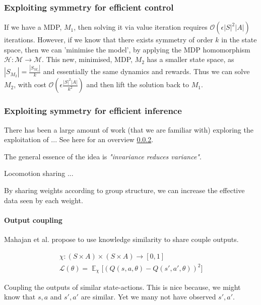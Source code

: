 \subsubsection{Exploiting symmetry for efficient control}

If we have a MDP, $M_1$, then solving it via value iteration requires $\mathcal O(\epsilon |S|^2|A|)$ iterations.
However, if we know that there exists symmetry of order $k$ in the state space, then we can 'minimise the model',
by applying the MDP homomorphism $\mathcal H: \mathcal M\to \mathcal M$.
This new, minimised, MDP, $M_2$ has a smaller state space, as $|S_{M_2}| = \frac{|S_{M_1}|}{k}$
and essentially the same dynamics and rewards. Thus we can solve $M_2$, with cost $\mathcal O(\epsilon \frac{|S|^2|A|}{k^2})$
and then lift the solution back to $M_1$. \cite{Dean1997, NARAYANAMURTHY}

\subsubsection{Exploiting symmetry for efficient inference}\label{symmetry-inference}

There has been a large amount of work (that we are familiar with) exploring
the exploitation of ... See  here for an overview \ref{symmetry-inference}.

The general essence of the idea is \textit{"invariance reduces variance"}. \cite{Chen2019}

Locomotion sharing ... \cite{Abdolhosseini}

By sharing weights according to group structure\cite{Ravanbakhsh2017a}, we can increase the effective data seen by each weight.

\paragraph{Output coupling}

Mahajan et al. propose to use knowledge similarity to share couple outputs.
\cite{Mahajan2017}

\begin{align*}
\chi: (S\times A) \times (S\times A) \to [0, 1] \\
\mathcal L(\theta) = \mathop{\mathbb E}_{\chi} \Big[(Q(s, a, \theta)-Q(s', a', \theta))^2 \Big]
\end{align*}

Coupling the outputs of similar state-actions. This is nice because, we might know
that $s, a$ and $s', a'$ are similar. Yet we many not have observed $s', a'$.

